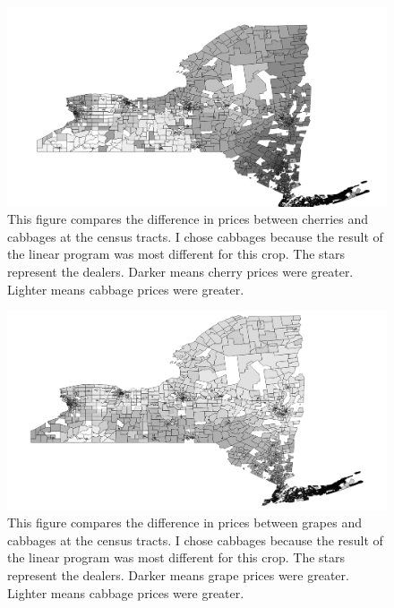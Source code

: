 \documentclass{report}
\begin{document}
\begin{figure}
\centering
\begin{framed}
\includegraphics[scale=.50]{stores_243_66}
\caption{This figure compares the difference in prices between cherries and cabbages at the census tracts. I chose cabbages because the result of the linear program was most different for this crop. The stars represent the dealers. Darker means cherry prices were greater. Lighter means cabbage prices were greater.}
\label{fig:stores_243_66}
\end{framed}
\end{figure}

\begin{figure}
\centering
\begin{framed}
\includegraphics[scale=.50]{stores_243_69}
\caption{This figure compares the difference in prices between grapes and cabbages at the census tracts. I chose cabbages because the result of the linear program was most different for this crop. The stars represent the dealers. Darker means grape prices were greater. Lighter means cabbage prices were greater.}
\label{fig:stores_243_69}
\end{framed}
\end{figure}
\end{document}

